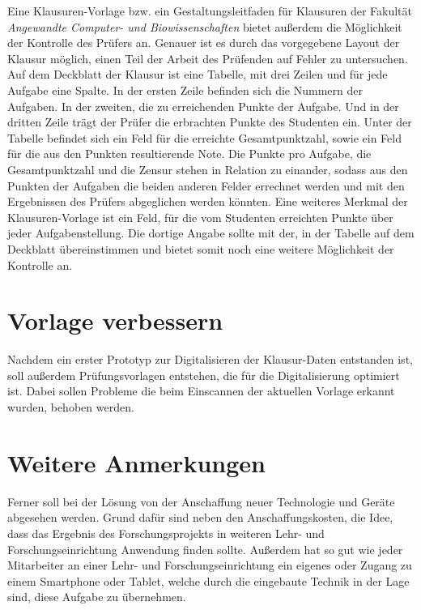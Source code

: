\documentclass[nomenclature, oneside, 150]{HSMW-Thesis}
\begin{document}
	Eine Klausuren-Vorlage bzw. ein Gestaltungsleitfaden für Klausuren der Fakultät \textit{Angewandte Computer- und Biowissenschaften} bietet außerdem die Möglichkeit der Kontrolle des Prüfers an. Genauer ist es durch das vorgegebene Layout der Klausur möglich, einen Teil der Arbeit des Prüfenden auf Fehler zu untersuchen. Auf dem Deckblatt der Klausur ist eine Tabelle, mit drei Zeilen und für jede Aufgabe eine Spalte. In der ersten Zeile befinden sich die Nummern der Aufgaben. In der zweiten, die zu erreichenden Punkte der Aufgabe. Und in der dritten Zeile trägt der Prüfer die erbrachten Punkte des Studenten ein. Unter der Tabelle befindet sich ein Feld für die erreichte Gesamtpunktzahl, sowie ein Feld für die aus den Punkten resultierende Note. Die Punkte pro Aufgabe, die Gesamtpunktzahl und die Zensur stehen in Relation zu einander, sodass aus den Punkten der Aufgaben die beiden anderen Felder errechnet werden und mit den Ergebnissen des Prüfers abgeglichen werden könnten. Eine weiteres Merkmal der Klausuren-Vorlage ist ein Feld, für die vom Studenten erreichten Punkte über jeder Aufgabenstellung. Die dortige Angabe sollte mit der, in der Tabelle auf dem Deckblatt übereinstimmen und bietet somit noch eine weitere Möglichkeit der Kontrolle an.
	
	\section{Vorlage verbessern}
	Nachdem ein erster Prototyp zur Digitalisieren der Klausur-Daten entstanden ist, soll außerdem Prüfungsvorlagen entstehen, die für die Digitalisierung optimiert ist. Dabei sollen Probleme die beim Einscannen der aktuellen Vorlage erkannt wurden, behoben werden. 
	
	\section{Weitere Anmerkungen}
	Ferner soll bei der Lösung von der Anschaffung neuer Technologie und Geräte abgesehen werden. Grund dafür sind neben den Anschaffungskosten, die Idee, dass das Ergebnis des Forschungsprojekts in weiteren Lehr- und Forschungseinrichtung Anwendung finden sollte. Außerdem hat so gut wie jeder Mitarbeiter an einer Lehr- und Forschungseinrichtung ein eigenes oder Zugang zu einem Smartphone oder Tablet, welche durch die eingebaute Technik in der Lage sind, diese Aufgabe zu übernehmen. 

\end{document}

